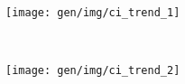 \begin{subfigure}[h]{.48\textwidth}
\centering
\texttt{[image: gen/img/ci\_trend\_1]}
\vspace{-1.5em} %
\caption{}
\label{fig:ci-trend-1}
\end{subfigure}
~%
\begin{subfigure}[h]{.48\textwidth}
\centering
\texttt{[image: gen/img/ci\_trend\_2]}
\vspace{-1.5em} %
\caption{}
\label{fig:ci-trend-2}
\end{subfigure}
